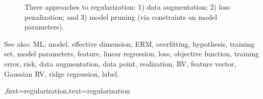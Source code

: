 {{\begin{figure}[H]
\begin{center}
				\caption{Three approaches to regularization: 1) data augmentation; 2) loss penalization; and 3) model 
				pruning (via constraints on model parameters). \label{fig_equiv_dataaug_penal_dict} }
			\end{center}
		\end{figure} 
		See also: ML, model, effective dimension, ERM, overfitting, hypothesis, training set, model parameters, feature, linear regression, loss, objective function, training error, risk, data augmentation, data point, realization, RV, feature vector, Gaussian RV, ridge regression, label.
		},first={regularization},text={regularization} }
	

